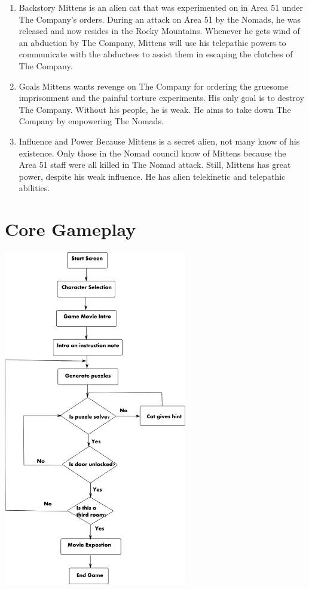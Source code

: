 \documentclass[12pt]{article}
\begin{document}
\begin{enumerate}
\item Backstory
\label{sec:orgdfbd59e}
Mittens is an alien cat that was experimented on in Area 51 under The Company's orders. During an attack on Area 51 by the Nomads, he was released and now resides in the Rocky Mountains. Whenever he gets wind of an abduction by The Company, Mittens will use his telepathic powers to communicate with the abductees to assist them in escaping the clutches of The Company.

\item Goals
\label{sec:orgd105c75}
Mittens wants revenge on The Company for ordering the gruesome imprisonment and the painful torture experiments. His only goal is to destroy The Company. Without his people, he is weak. He aims to take down The Company by empowering The Nomads.

\item Influence and Power
\label{sec:orga63da94}
Because Mittens is a secret alien, not many know of his existence. Only those in the Nomad council know of Mittens because the Area 51 staff were all killed in The Nomad attack. Still, Mittens has great power, despite his weak influence. He has alien telekinetic and telepathic abilities.
\end{enumerate}

\section{Core Gameplay}
\label{sec:org7f26ec5}
\begin{center}
\includegraphics[width=8cm]{./img/game-flow.png}
\end{center}
\end{document}
